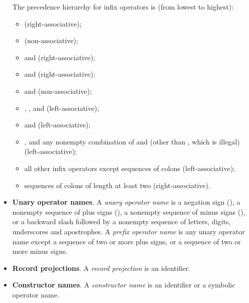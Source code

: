 \begin{itemize}
  The precedence hierarchy for infix operators is (from lowest to highest):
  \begin{itemize}
  \item \ecnocolors{=>} (right-associative);

  \item \ecnocolors{<=>} (non-associative);

  \item \ecnocolors{||} and \ecnocolors{\\/} (right-associative);

  \item \ecnocolors{&&} and \ecnocolors{/\\} (right-associative);

  \item \ecnocolors{=} and \ecnocolors{<>} (non-associative);

  \item \ecnocolors{<}, \ecnocolors{>}, \ecnocolors{<=} and \ecnocolors{>=}
    (left-associative);

  \item \ecnocolors{-} and \ecnocolors{+} (left-associative);

  \item \ecnocolors{*}, and any nonempty combination of \ecnocolors{/} and
    \ecnocolors{\%} (other than \ecnocolors{//}, which is illegal)
    (left-associative);

  \item all other infix operators except sequences of colons
    (left-associative);

  \item sequences of colons of length at least two (right-associative).
  \end{itemize}

\item \textbf{Unary operator names}. A \emph{unary operator name} is a
  negation sign (\ec{!}), a nonempty sequence of plus signs (\ec{+}),
  a nonempty sequence of minus signs (\ec{-}), or a backward slash
  followed by a nonempty sequence of letters, digits, underscores and
  apostrophes.  A \emph{prefix operator name} is any unary operator
  name except a sequence of two or more plus signs, or a sequence of
  two or more minus signs.

\item \textbf{Record projections}. A \emph{record projection} is an
  identifier.

\item \textbf{Constructor names}. A \emph{constructor name} is an identifier
  or a symbolic operator name.


\end{itemize}
